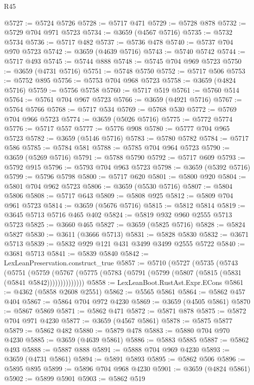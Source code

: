 \begin{lexlean}{R45}
\begin{coremodule}
@5727 := @5724 @5726
@5728 := @5717 @471
@5729 := @5728 @878
@5732 := @5729 @704 @971 @5723
@5734 := @3659 (@4567 @5716)
@5735 := @5732 @5734
@5736 := @5717 @482
@5737 := @5736 @478
@5740 := @5737 @704 @970 @5723
@5742 := @3659 (@4639 @5716)
@5743 := @5740 @5742
@5744 := @5717 @493
@5745 := @5744 @888
@5748 := @5745 @704 @969 @5723
@5750 := @3659 (@4731 @5716)
@5751 := @5748 @5750
@5752 := @5717 @506
@5753 := @5752 @895
@5756 := @5753 @704 @968 @5723
@5758 := @3659 (@4824 @5716)
@5759 := @5756 @5758
@5760 := @5717 @519
@5761 := @5760 @514
@5764 := @5761 @704 @967 @5723
@5766 := @3659 (@4921 @5716)
@5767 := @5764 @5766
@5768 := @5717 @534
@5769 := @5768 @530
@5772 := @5769 @704 @966 @5723
@5774 := @3659 (@5026 @5716)
@5775 := @5772 @5774
@5776 := @5717 @557
@5777 := @5776 @908
@5780 := @5777 @704 @965 @5723
@5782 := @3659 (@5146 @5716)
@5783 := @5780 @5782
@5784 := @5717 @586
@5785 := @5784 @581
@5788 := @5785 @704 @964 @5723
@5790 := @3659 (@5269 @5716)
@5791 := @5788 @5790
@5792 := @5717 @609
@5793 := @5792 @915
@5796 := @5793 @704 @963 @5723
@5798 := @3659 (@5392 @5716)
@5799 := @5796 @5798
@5800 := @5717 @620
@5801 := @5800 @920
@5804 := @5801 @704 @962 @5723
@5806 := @3659 (@5530 @5716)
@5807 := @5804 @5806
@5808 := @5717 @643
@5809 := @5808 @925
@5812 := @5809 @704 @961 @5723
@5814 := @3659 (@5676 @5716)
@5815 := @5812 @5814
@5819 := @3645 @5713 @5716 @465 @402
@5824 := @5819 @932 @960 @2555 @5713 @5723
@5825 := @3660 @465
@5827 := @3659 (@5825 @5716)
@5828 := @5824 @5827
@5830 := @3611 (@3666 @5713)
@5831 := @5828 @5830
@5832 := @3671 @5713
@5839 := @5832 @929 @121 @431 @3499 @3499 @2555 @5722
@5840 := @3681 @5713
@5841 := @5839 @5840
@5842 := LexLeanPreservation.construct_true
@5857 := @5710
    (@5727
      (@5735
        (@5743
          (@5751
            (@5759
              (@5767 (@5775 (@5783 (@5791 (@5799 (@5807 (@5815 (@5831 (@5841 @5842))))))))))))))
@5858 := LexLeanBoot.RustAst.Expr.ECons
@5861 := @4362 (@5858 @2608 @2551)
@5862 := @5565 @5861
@5864 := @5862 @457 @404
@5867 := @5864 @704 @972 @4230
@5869 := @3659 (@4505 @5861)
@5870 := @5867 @5869
@5871 := @5862 @471
@5872 := @5871 @878
@5875 := @5872 @704 @971 @4230
@5877 := @3659 (@4567 @5861)
@5878 := @5875 @5877
@5879 := @5862 @482
@5880 := @5879 @478
@5883 := @5880 @704 @970 @4230
@5885 := @3659 (@4639 @5861)
@5886 := @5883 @5885
@5887 := @5862 @493
@5888 := @5887 @888
@5891 := @5888 @704 @969 @4230
@5893 := @3659 (@4731 @5861)
@5894 := @5891 @5893
@5895 := @5862 @506
@5896 := @5895 @895
@5899 := @5896 @704 @968 @4230
@5901 := @3659 (@4824 @5861)
@5902 := @5899 @5901
@5903 := @5862 @519

\end{coremodule}
\end{lexlean}
